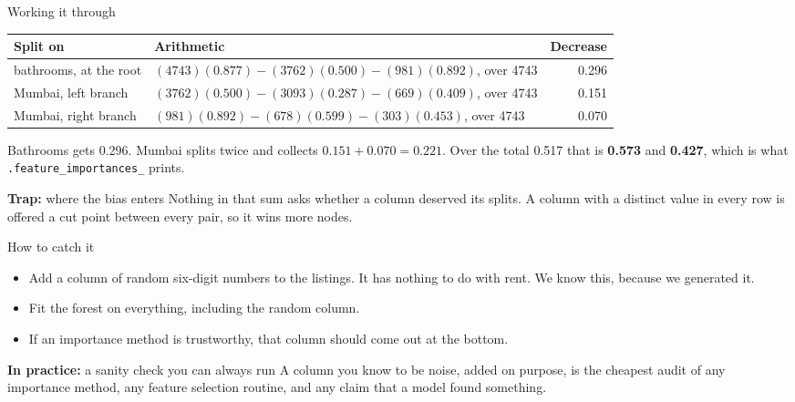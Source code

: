 \documentclass[aspectratio=169]{beamer}
\newenvironment{trap}[1]{\begin{alertblock}{\textbf{Trap:} #1}}{\end{alertblock}}
\newenvironment{practice}[1]{\begin{exampleblock}{\textbf{In practice:} #1}}{\end{exampleblock}}
\begin{document}
\begin{frame}{Working it through}
\begin{center}\scriptsize
\begin{tabular}{L{0.22\textwidth} L{0.44\textwidth} r}
\toprule
\textbf{Split on} & \textbf{Arithmetic} & \textbf{Decrease} \\
\midrule
bathrooms, at the root &
$(4743)(0.877) - (3762)(0.500) - (981)(0.892)$, over 4743 & 0.296 \\
Mumbai, left branch &
$(3762)(0.500) - (3093)(0.287) - (669)(0.409)$, over 4743 & 0.151 \\
Mumbai, right branch &
$(981)(0.892) - (678)(0.599) - (303)(0.453)$, over 4743 & 0.070 \\
\bottomrule
\end{tabular}
\end{center}
Bathrooms gets 0.296. Mumbai splits twice and collects $0.151 + 0.070 = 0.221$. Over the total
0.517 that is \textbf{0.573} and \textbf{0.427}, which is what
\texttt{.feature\_importances\_} prints.
\begin{trap}{where the bias enters}
Nothing in that sum asks whether a column deserved its splits. A column with a distinct value in
every row is offered a cut point between every pair, so it wins more nodes.
\end{trap}
\end{frame}

\begin{frame}{How to catch it}
\begin{itemize}
  \item Add a column of random six-digit numbers to the listings. It has nothing to do with rent.
        We know this, because we generated it.
  \item Fit the forest on everything, including the random column.
  \item If an importance method is trustworthy, that column should come out at the bottom.
\end{itemize}
\begin{practice}{a sanity check you can always run}
A column you know to be noise, added on purpose, is the cheapest audit of any importance method,
any feature selection routine, and any claim that a model found something.
\end{practice}
\end{frame}
\end{document}

